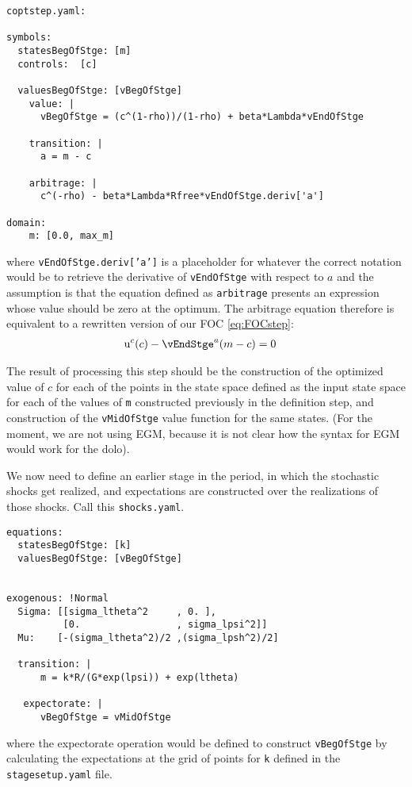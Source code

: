 \documentclass[SolvingMicroDSOPs]{subfiles}
\begin{document}
\begin{verbatim}
coptstep.yaml:

symbols:
  statesBegOfStge: [m]
  controls:  [c]

  valuesBegOfStge: [vBegOfStge]
    value: |
      vBegOfStge = (c^(1-rho))/(1-rho) + beta*Lambda*vEndOfStge

    transition: |
      a = m - c

    arbitrage: |
      c^(-rho) - beta*Lambda*Rfree*vEndOfStge.deriv['a'] 

domain:
    m: [0.0, max_m]

\end{verbatim}
where \texttt{vEndOfStge.deriv['a']} is a placeholder for whatever the correct notation would be to retrieve the derivative of \texttt{vEndOfStge} with respect to $a$ and the assumption is that the equation defined as \texttt{arbitrage} presents an expression whose value should be zero at the optimum.  The arbitrage equation therefore is equivalent to a rewritten version of our FOC \eqref{eq:FOCstep}:
\begin{align}
  \uFunc^{{c}}(c) - \vEndStge^{{a}}(m-c) & = 0
\end{align}

The result of processing this step should be the construction of the optimized value of $c$ for each of the points in the state space defined as the input state space for each of the values of \texttt{m} constructed previously in the definition step, and construction of the \texttt{vMidOfStge} value function for the same states. (For the moment, we are not using EGM, because it is not clear how the syntax for EGM would work for the dolo).

We now need to define an earlier stage in the period, in which the stochastic shocks get realized, and expectations are constructed over the realizations of those shocks.  Call this \texttt{shocks.yaml}.

\begin{verbatim}
equations:
  statesBegOfStge: [k]
  valuesBegOfStge: [vBegOfStge]


exogenous: !Normal
  Sigma: [[sigma_ltheta^2     , 0. ],
          [0.                 , sigma_lpsi^2]]
  Mu:    [-(sigma_ltheta^2)/2 ,(sigma_lpsh^2)/2]

  transition: |
      m = k*R/(G*exp(lpsi)) + exp(ltheta)

   expectorate: |
      vBegOfStge = vMidOfStge
\end{verbatim}
where the expectorate operation would be defined to construct \texttt{vBegOfStge} by calculating the expectations at the grid of points for \texttt{k} defined in the \texttt{stagesetup.yaml} file.
\end{document}
